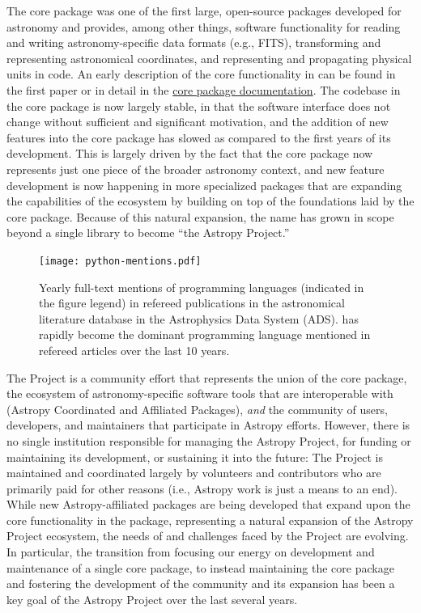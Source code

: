 \documentclass[modern]{aastex631}
\begin{document}
The \astropypkg core package was one of the first large, open-source \python
packages developed for astronomy and provides, among other things, software
functionality for reading and writing astronomy-specific data formats (e.g.,
FITS), transforming and representing astronomical coordinates, and representing
and propagating physical units in code.
An early description of the core functionality in \astropypkg can be found in
the first \astropy paper \citep{astropy:2013} or in detail in the
\href{https://docs.astropy.org/}{core package documentation}.
The codebase in the \astropypkg core package is now largely stable, in that the
software interface does not change without sufficient and significant
motivation, and the addition of new features into the core package has slowed
as compared to the first years of its development.
This is largely driven by the fact that the core package now represents just one
piece of the broader astronomy \python context, and new feature development
is now happening in more specialized packages that are expanding the
capabilities of the \astropy ecosystem by building on top of the foundations
laid by the \astropypkg core package.
Because of this natural expansion, the name \astropy has grown in scope beyond a
single \python library to become ``the Astropy Project.''

\begin{figure}[th]
    \begin{centering}
      \texttt{[image: python-mentions.pdf]}
        \caption{
            Yearly full-text mentions of programming languages (indicated in the
            figure legend) in refereed publications in the astronomical
            literature database in the Astrophysics Data System (ADS).
            \python has rapidly become the dominant programming language
            mentioned in refereed articles over the last 10 years.
        }
        \label{fig:python-mentions}
    \end{centering}
\end{figure}

The \astropy Project is a community effort that represents the union of the
\astropypkg core package, the ecosystem of astronomy-specific software tools
that are interoperable with \astropypkg (Astropy Coordinated and Affiliated Packages),
\emph{and} the community of users, developers, and maintainers that participate
in Astropy efforts.
However, there is no single institution responsible for managing the Astropy Project,
for funding or maintaining its development, or sustaining it into the future:
The Project is maintained and coordinated largely by volunteers and contributors
who are primarily paid for other reasons (i.e., Astropy work is just a means to an end).
While new Astropy-affiliated packages are being developed that expand upon the
core functionality in the \astropypkg package, representing a natural expansion
of the Astropy Project ecosystem, the needs of and challenges faced by the
Project are evolving.
In particular, the transition from focusing our energy on development and
maintenance of a single core package, to instead maintaining the core package
and fostering the development of the community and its expansion has been a key
goal of the Astropy Project over the last several years.
\end{document}
